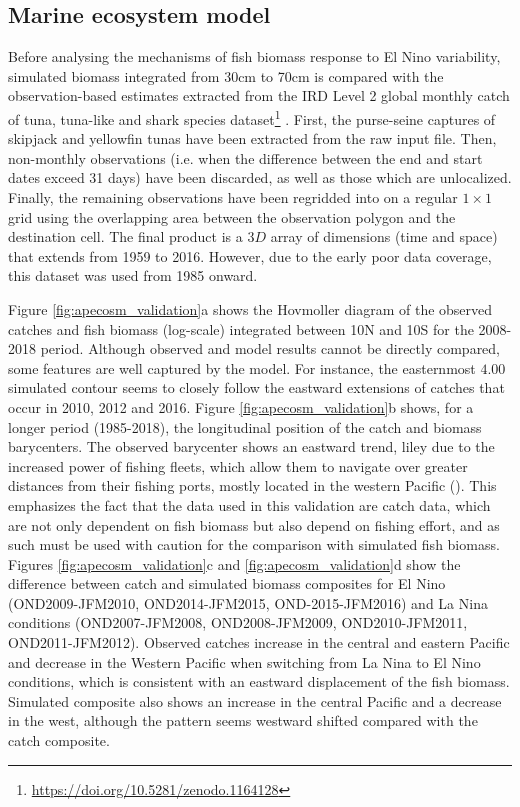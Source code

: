 \subsection{Marine ecosystem model}

Before analysing the mechanisms of fish biomass response to El Nino variability, simulated biomass integrated from 30cm to 70cm is compared with the observation-based estimates extracted from the IRD Level 2 global monthly catch of tuna, tuna-like and shark species dataset\footnote{\url{https://doi.org/10.5281/zenodo.1164128}} \citep{taconetGlobalMonthlyCatch2018}. First, the purse-seine captures of skipjack and yellowfin tunas have been extracted from the raw input file. Then, non-monthly observations (i.e. when the difference between the end and start dates exceed 31 days) have been discarded, as well as those which are unlocalized. Finally, the remaining observations have been regridded into on a regular $1 \times 1$ grid using the overlapping area between the observation polygon and the destination cell. The final product is a $3D$ array of dimensions (time and space) that extends from 1959 to 2016. However, due to the early poor data coverage, this dataset was used from 1985 onward.

Figure \ref{fig:apecosm_validation}a shows the Hovmoller diagram of the observed catches and fish biomass (log-scale) integrated between 10N and 10S for the 2008-2018 period. Although observed and model results cannot be directly compared, some features are well captured by the model. For instance, the easternmost $4.00$ simulated contour seems to closely follow the eastward extensions of catches that occur in 2010, 2012 and 2016. Figure \ref{fig:apecosm_validation}b shows, for a longer period (1985-2018), the longitudinal position of the catch and biomass barycenters. The observed barycenter shows an eastward trend, liley due to the increased power of fishing fleets, which allow them to navigate over greater distances from their fishing ports, mostly located in the western Pacific (). This emphasizes the fact that the data used in this validation are catch data, which are not only dependent on fish biomass but also depend on fishing effort, and as such must be used with caution for the comparison with simulated fish biomass. Figures \ref{fig:apecosm_validation}c and \ref{fig:apecosm_validation}d show the difference between catch and simulated biomass composites for El Nino (OND2009-JFM2010, OND2014-JFM2015, OND-2015-JFM2016) and La Nina conditions (OND2007-JFM2008, OND2008-JFM2009, OND2010-JFM2011, OND2011-JFM2012). Observed catches increase in the central and eastern Pacific and decrease in the Western Pacific when switching from La Nina to El Nino conditions, which is consistent with an eastward displacement of the fish biomass. Simulated composite also shows an increase in the central Pacific and a decrease in the west, although the pattern seems westward shifted compared with the catch composite. 

